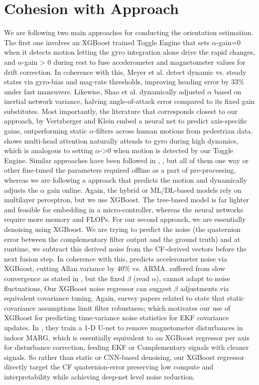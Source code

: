\documentclass{iutbscthesis}
\begin{document}
\section{Cohesion with Approach}
We are following two main approaches for conducting the orientation estimation. The first one involves an XGBoost trained Toggle Engine that sets $\alpha$-gain=0 when it detects motion letting the gyro integration alone drive the rapid changes, and $\alpha$-gain > 0 during rest to fuse accelerometer and magnetometer values for drift correction. In coherence with this, Meyer et al. \cite{CEAS-GNC-2019-036} detect dynamic vs. steady states via gyro-bias and mag-rate thresholds, improving heading error by 33\% under fast maneuvers. Likewise, Shao et al. \cite{shao2023variablegainflushsesnsing} dynamically adjusted $\alpha$ based on inertial network variance, halving angle-of-attack error compared to its fixed gain substitutes. Most importantly, the literature that corresponds closest to our approach, \cite{vertzberger2022adaptive} by Vertzberger and Klein embed a neural net to predict axis-specific gains, outperforming static $\alpha$-filters across human motions from pedestrian data. \cite{tedaldi2014multihead} shows multi-head attention naturally attends to gyro during high dynamics, which is analogous to setting $\alpha$->0 when motion is detected by our Toggle Engine. Similar approaches have been followed in \cite{georgiou2013linearnonlinear}, \cite{bettermadg}, \cite{golroudbari2023cnn6DOF} but all of them one way or other fine-tuned the parameters required offline as a part of pre-processing, whereas we are following a approach that predicts the motion and dynamically adjusts the $\alpha$ gain online. Again, the hybrid or ML/DL-based models rely on multilayer perceptron, but we use XGBoost. The tree-based model is far lighter and feasible for embedding in a micro-controller, whereas the neural networks require more memory and FLOPs. 
For our second approach, we are essentially denoising using XGBoost. We are trying to predict the noise (the quaternion error between the complementary filter output and the ground truth)  and at runtime, we subtract this derived noise from the CF-derived vectors before the next fusion step. In coherence with this, \cite{wang2020mems} predicts accelerometer noise via XGBoost, cutting Allan variance by 40\% vs. ARMA. \cite{extendedMADG} suffered from slow convergence  as stated in \cite{madgwick2011estimation}, but the fixed $\beta$ (read $\alpha$), cannot adapt to noise fluctuations, Our XGBoost noise regressor can suggest $\beta$ adjustments via equivalent covariance tuning. Again, survey papers related to \cite{EKF} state that static covariance assumptions limit filter robustness; which motivates our use of XGBoost for predicting time-variance noise statistics for EKF covariance updates. In \cite{wang2020mems}, they train a 1-D U-net to remove magnetometer disturbances in indoor MARG, which is essentially equivalent to an XGBoost regressor per axis for disturbance correction, feeding EKF or Complementary signals with cleaner signals. So rather than static or CNN-based denoising, our XGBoost regressor directly target the CF quaternion-error preserving low compute and interpretability while achieving deep-net level noise reduction. 
\end{document}
